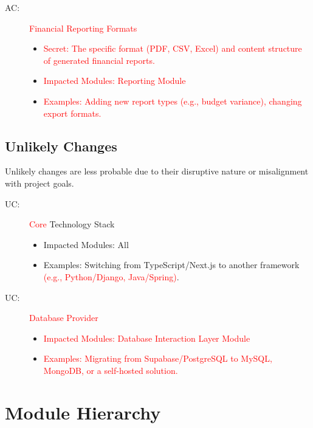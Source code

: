 \documentclass[12pt, titlepage]{article}
\newcounter{acnum}
\newcommand{\actheacnum}{AC\theacnum}
\newcounter{ucnum}
\newcommand{\uctheucnum}{UC\theucnum}
\begin{document}
\begin{description}
\item[ \actheacnum \label{acReporting}:] \textcolor{red}{Financial Reporting Formats}
\begin{itemize}
    \item \textcolor{red}{Secret:} \textcolor{red}{The specific format (PDF, CSV, Excel) and content structure of generated financial reports.}
    \item \textcolor{red}{Impacted Modules:} \textcolor{red}{Reporting Module}
    \item \textcolor{red}{Examples:} \textcolor{red}{Adding new report types (e.g., budget variance), changing export formats.}
\end{itemize}
\end{description}

\subsection{Unlikely Changes} \label{SecUchange}

Unlikely changes are less probable due to their disruptive nature or misalignment with project goals.

\begin{description}
\item[ \uctheucnum \label{ucTechStack}:] \textcolor{red}{Core} Technology Stack
\begin{itemize}
    \item Impacted Modules: All
    \item Examples: Switching from TypeScript/Next.js to another framework \textcolor{red}{(e.g., Python/Django, Java/Spring)}.
\end{itemize}

\item[ \uctheucnum \label{ucDatabase}:] \textcolor{red}{Database Provider}
\begin{itemize}
    \item \textcolor{red}{Impacted Modules:} \textcolor{red}{Database Interaction Layer Module}
    \item \textcolor{red}{Examples:} \textcolor{red}{Migrating from Supabase/PostgreSQL to MySQL, MongoDB, or a self-hosted solution.}
\end{itemize}
\end{description}

\section{Module Hierarchy} \label{SecMH}
\end{document}
